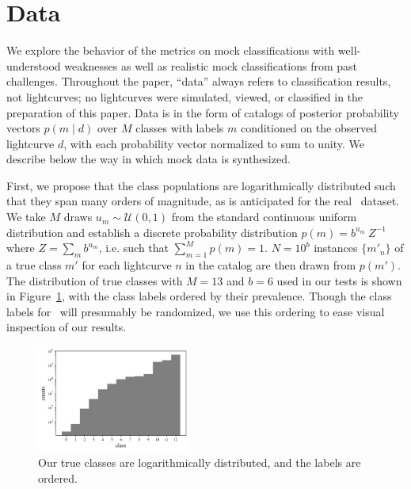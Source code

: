 \section{Data}
\label{sec:data}

We explore the behavior of the metrics on mock classifications with well-understood weaknesses as well as realistic mock classifications from past challenges.
Throughout the paper, ``data'' always refers to classification results, not lightcurves; no lightcurves were simulated, viewed, or classified in the preparation of this paper.
Data is in the form of catalogs of posterior probability vectors $p(m \mid d)$ over $M$ classes with labels $m$ conditioned on the observed lightcurve $d$, with each probability vector normalized to sum to unity.
We describe below the way in which mock data is synthesized.

First, we propose that the class populations are logarithmically distributed such that they span many orders of magnitude, as is anticipated for the real \lsst\ dataset.
We take $M$ draws $u_{m} \sim \mathcal{U}(0, 1)$ from the standard continuous uniform distribution and establish a discrete probability distribution $p(m) = b^{u_{m}}\ Z^{-1}$ where $Z = \sum_{m} b^{u_{m}}$, i.e. such that $\sum_{m=1}^{M} p(m) = 1$.
$N = 10^{b}$ instances $\{m'_{n}\}$ of a true class $m'$ for each lightcurve $n$ in the catalog are then drawn from $p(m')$.
The distribution of true classes with $M = 13$ and $b = 6$ used in our tests is shown in Figure~\ref{fig:classdist}, with the class labels ordered by their prevalence.
Though the class labels for \plasticc\ will presumably be randomized, we use this ordering to ease visual inspection of our results.

\begin{figure}
	\begin{center}
    \includegraphics[width=0.45\textwidth]{./fig/complete_counts.png}
		\caption{Our true classes are logarithmically distributed, and the labels are ordered.}
		\label{fig:classdist}
	\end{center}
\end{figure}

